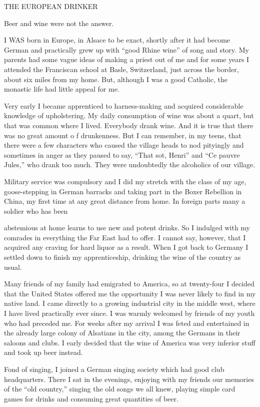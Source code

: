 
THE EUROPEAN DRINKER

Beer and wine were not the answer.

      I WAS born in Europe, in Alsace to be exact, shortly after it had become German and practically grew up with “good Rhine wine” of song and story. My parents had some vague ideas of making a priest out of me and for some years I attended the Franciscan school at Basle, Switzerland, just across the border, about six miles from my home. But, although I was a good Catholic, the monastic life had little appeal for me.

Very early I became apprenticed to harness-making and acquired considerable knowledge of upholstering. My daily consumption of wine was about a quart, but that was common where I lived. Everybody drank wine. And it is true that there was no great amount o f drunkenness. But I can remember, in my teens, that there were a few characters who caused the village heads to nod pityingly and sometimes in anger as they paused to say, “That sot, Henri” and “Ce pauvre Jules,” who drank too much. They were undoubtedly the alcoholics of our village.

Military service was compulsory and I did my stretch with the class of my age, goose-stepping in German barracks and taking part in the Boxer Rebellion in China, my first time at any great distance from home. In foreign parts many a soldier who has been

abstemious at home learns to use new and potent drinks. So I indulged with my comrades in everything the Far East had to offer. I cannot say, however, that I acquired any craving for hard liquor as a result. When I got back to Germany I settled down to finish my apprenticeship, drinking the wine of the country as usual.

Many friends of my family had emigrated to America, so at twenty-four I decided that the United States offered me the opportunity I was never likely to find in my native land. I came directly to a growing industrial city in the middle west, where I have lived practically ever since. I was warmly welcomed by friends of my youth who had preceded me. For weeks after my arrival I was feted and entertained in the already large colony of Alsatians in the city, among the Germans in their saloons and clubs. I early decided that the wine of America was very inferior stuff and took up beer instead.

Fond of singing, I joined a German singing society which had good club headquarters. There I sat in the evenings, enjoying with my friends our memories of the “old country,” singing the old songs we all knew, playing simple card games for drinks and consuming great quantities of beer.

